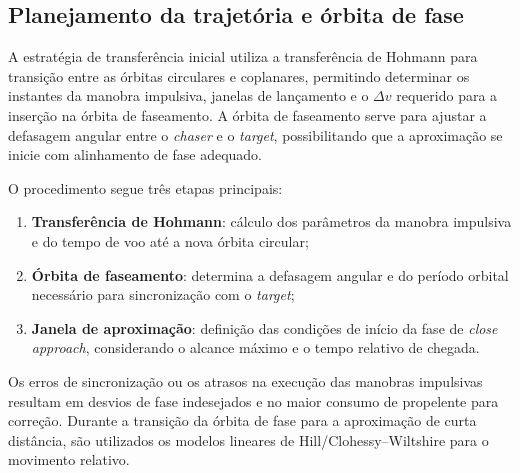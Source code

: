 \subsection{Planejamento da trajetória e órbita de fase}

A estratégia de transferência inicial utiliza a transferência de Hohmann para transição entre as órbitas circulares e coplanares, permitindo determinar os instantes da manobra impulsiva, janelas de lançamento e o $\Delta v$ requerido para a inserção na órbita de faseamento. 
A órbita de faseamento serve para ajustar a defasagem angular entre o \emph{chaser} e o \emph{target}, possibilitando que a aproximação se inicie com alinhamento de fase adequado.

O procedimento segue três etapas principais:
\begin{enumerate}[label=\roman*.]
    \item \textbf{Transferência de Hohmann}: cálculo dos parâmetros da manobra impulsiva e do tempo de voo até a nova órbita circular;
    \item \textbf{Órbita de faseamento}: determina a defasagem angular e do período orbital necessário para sincronização com o \emph{target};
    \item \textbf{Janela de aproximação}: definição das condições de início da fase de \emph{close approach}, considerando o alcance máximo e o tempo relativo de chegada.
\end{enumerate}

Os erros de sincronização ou os atrasos na execução das manobras impulsivas resultam em desvios de fase indesejados e no maior consumo de propelente para correção.  
Durante a transição da órbita de fase para a aproximação de curta distância, são utilizados os modelos lineares de Hill/Clohessy--Wiltshire para o movimento relativo.

